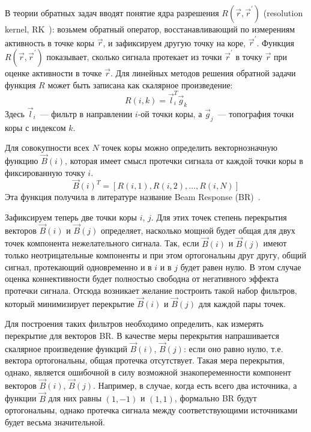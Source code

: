 В теории обратных задач вводят понятие ядра разрешения $R(\vec{r},
\vec{r}^{\prime})$ (resolution kernel, RK~\cite{sekikhara_nagarajan}): возьмем
обратный оператор, восстанавливающий по измерениям активность в точке коры
$\vec{r}$, и зафиксируем другую точку на коре, $\vec{r}^{\prime}$.  Функция
$R(\vec{r}, \vec{r}^{\prime})$ показывает, сколько сигнала протекает из точки
$\vec{r}^{\prime}$ в точку $\vec{r}$ при оценке активности в точке $\vec{r}$.
Для линейных методов решения обратной задачи функция $R$ может быть записана как
скалярное произведение:
\begin{equation}
    R(i, k) = \vec{l}_i^T \vec{g}_k
    \label{eq:resolution_kernel}
\end{equation}
Здесь $\vec{l}_i$~--- фильтр в направлении $i$-ой точки коры, а
$\vec{g}_j$~--- топография точки коры с индексом $k$.

Для совокупности всех $N$ точек коры можно определить векторнозначную функцию
$\vec{B}(i)$, которая имеет смысл протечки сигнала от каждой точки коры в
фиксированную точку $i$. 
\begin{equation}
    \vec{B}{(i)}^T = \left[R{(i, 1)}, R(i, 2), \ldots, R(i, N)\right]
\end{equation}
Эта функция получила в литературе название Beam Response (BR)~\cite{sekikhara_nagarajan}.


Зафиксируем теперь две точки коры $i$, $j$. Для этих точек степень перекрытия векторов $\vec{B}(i)$ и $\vec{B}(j)$ определяет, насколько мощной будет общая для двух точек компонента нежелательного сигнала. Так, если $\vec{B}(i)$ и $\vec{B}(j)$ имеют только неотрицательные компоненты и при этом
ортогональны друг другу, общий сигнал, протекающий одновременно и в $i$ и в $j$ будет равен нулю. В этом случае оценка коннективности будет полностью свободна от негативного эффекта протечки сигнала. Отсюда возникает желание построить такой набор фильтров, который минимизирует перекрытие $\vec{B}(i)$ и $\vec{B}(j)$ для каждой пары точек.

Для построения таких фильтров необходимо определить, как измерять перекрытие
для векторов BR. В качестве меры перекрытия напрашивается скалярное
произведение функций $\vec{B}(i)$, $\vec{B}(j)$: если оно равно нулю, т.е. вектора ортогональны,
общая протечка отсутствует. Такая мера перекрытия, однако, является ошибочной в силу возможной
знакопеременности компонент векторов $\vec{B}(i)$, $\vec{B}(j)$. Например, в случае, когда есть всего два источника, а функции $\vec{B}$ для них равны $(1, -1)$ и $(1, 1)$, формально BR будут
ортогональны, однако протечка сигнала между соответствующими источниками будет весьма значительной.

